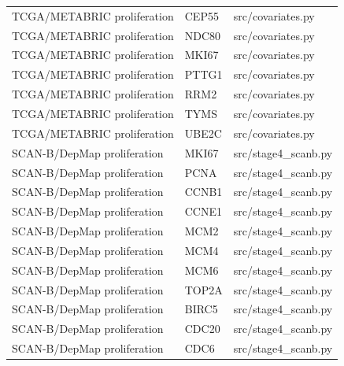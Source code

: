 \begin{longtable}{lll}
TCGA/METABRIC proliferation & CEP55 & src/covariates.py \\
TCGA/METABRIC proliferation & NDC80 & src/covariates.py \\
TCGA/METABRIC proliferation & MKI67 & src/covariates.py \\
TCGA/METABRIC proliferation & PTTG1 & src/covariates.py \\
TCGA/METABRIC proliferation & RRM2 & src/covariates.py \\
TCGA/METABRIC proliferation & TYMS & src/covariates.py \\
TCGA/METABRIC proliferation & UBE2C & src/covariates.py \\
SCAN-B/DepMap proliferation & MKI67 & src/stage4\_scanb.py \\
SCAN-B/DepMap proliferation & PCNA & src/stage4\_scanb.py \\
SCAN-B/DepMap proliferation & CCNB1 & src/stage4\_scanb.py \\
SCAN-B/DepMap proliferation & CCNE1 & src/stage4\_scanb.py \\
SCAN-B/DepMap proliferation & MCM2 & src/stage4\_scanb.py \\
SCAN-B/DepMap proliferation & MCM4 & src/stage4\_scanb.py \\
SCAN-B/DepMap proliferation & MCM6 & src/stage4\_scanb.py \\
SCAN-B/DepMap proliferation & TOP2A & src/stage4\_scanb.py \\
SCAN-B/DepMap proliferation & BIRC5 & src/stage4\_scanb.py \\
SCAN-B/DepMap proliferation & CDC20 & src/stage4\_scanb.py \\
SCAN-B/DepMap proliferation & CDC6 & src/stage4\_scanb.py \\
\end{longtable}
